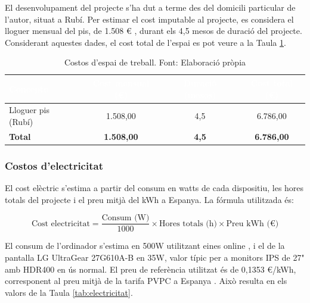 \documentclass[11pt,a4paper]{report}
\begin{document}
El desenvolupament del projecte s'ha dut a terme des del domicili particular de l'autor, situat a Rubí. Per estimar el cost imputable al projecte, es considera el lloguer mensual del pis, de 1.508 € \cite{enalquilercom_precio_nodate} , durant els 4,5 mesos de duració del projecte. Considerant aquestes dades, el cost total de l'espai es pot veure a la Taula \ref{tab:espai}.

\begin{table}[H]
    \centering
    \small
    \renewcommand{\arraystretch}{2}
    \begin{tabular}{|l|c|c|c|}
        \hline
        \rowcolor{oceanblue}
        \textcolor{white}{\textbf{Concepte}} &
        \textcolor{white}{\textbf{Cost mensual (€)}} &
        \textcolor{white}{\textbf{Duració (mesos)}} &
        \textcolor{white}{\textbf{Cost total (€)}} \\
        \hline
        Lloguer pis (Rubí) & 1.508,00 & 4,5 & 6.786,00 \\
        \hline
        \rowcolor{gray!20}
        \textbf{Total} & \textbf{1.508,00} & \textbf{4,5} & \textbf{6.786,00} \\
        \hline
    \end{tabular}
    \caption[Costos d'espai]{Costos d'espai de treball. Font: Elaboració pròpia}
    \label{tab:espai}
\end{table}


\subsubsection{Costos d'electricitat}
El cost elèctric s'estima a partir del consum en watts de cada dispositiu, 
les hores totals del projecte i el preu mitjà del kWh a Espanya. 
La fórmula utilitzada és:

\begin{equation}
    \text{Cost electricitat} = \frac{\text{Consum (W)}}{1000} 
    \times \text{Hores totals (h)} \times \text{Preu kWh (€)}
    \label{eq:electricitat}
\end{equation}

El consum de l'ordinador s'estima en 500W utilitzant eines online \cite{newegg_power_nodate}, i el de la pantalla LG UltraGear 27G610A-B en 35W, valor típic per a monitors IPS de 27" amb HDR400 en ús normal. 
El preu de referència utilitzat és de 0,1353 €/kWh, corresponent al preu mitjà 
de la tarifa PVPC a Espanya \cite{tarifa_luz_hora_precio_nodate}. Això resulta en els valors de la Taula \ref{tab:electricitat}.
\end{document}
